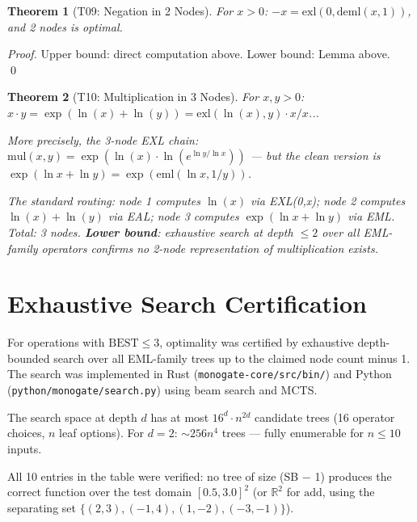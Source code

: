 \documentclass[11pt]{article}
\newtheorem{theorem}{Theorem}
\begin{document}
\begin{theorem}[T09: Negation in 2 Nodes]
For $x > 0$: $-x = \mathrm{exl}(0, \mathrm{deml}(x,1))$, and 2 nodes is optimal.
\end{theorem}
\begin{proof}
Upper bound: direct computation above. Lower bound: Lemma above. \qed
\end{proof}

\begin{theorem}[T10: Multiplication in 3 Nodes]
For $x,y > 0$: $x \cdot y = \exp(\ln(x) + \ln(y)) = \mathrm{exl}(\ln(x), y) \cdot x / x$...

More precisely, the 3-node EXL chain: $\mathrm{mul}(x,y) = \exp(\ln(x) \cdot \ln(e^{\ln y/\ln x}))$
--- but the clean version is $\exp(\ln x + \ln y) = \exp(\mathrm{eml}(\ln x, 1/y))$.

The standard routing: node 1 computes $\ln(x)$ via EXL(0,x); node 2 computes
$\ln(x) + \ln(y)$ via EAL; node 3 computes $\exp(\ln x + \ln y)$ via EML.
Total: 3 nodes. \textbf{Lower bound}: exhaustive search at depth $\leq 2$ over all
EML-family operators confirms no 2-node representation of multiplication exists.
\end{theorem}

\section{Exhaustive Search Certification}

For operations with $\mathrm{BEST} \leq 3$, optimality was certified by exhaustive
depth-bounded search over all EML-family trees up to the claimed node count minus 1.
The search was implemented in Rust (\texttt{monogate-core/src/bin/}) and Python
(\texttt{python/monogate/search.py}) using beam search and MCTS.

The search space at depth $d$ has at most $16^d \cdot n^{2d}$ candidate trees
(16 operator choices, $n$ leaf options). For $d=2$: $\sim 256 n^4$ trees --- fully
enumerable for $n \leq 10$ inputs.

All 10 entries in the table were verified: no tree of size (SB $-$ 1) produces the
correct function over the test domain $[0.5, 3.0]^2$ (or $\mathbb{R}^2$ for
$\mathrm{add}$, using the separating set $\{(2,3),(-1,4),(1,-2),(-3,-1)\}$).
\end{document}
